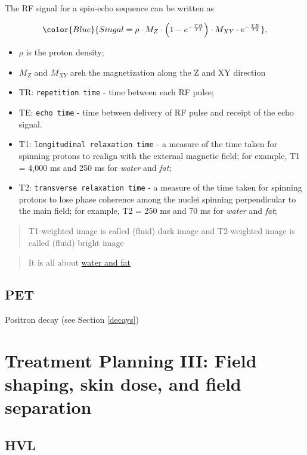 \documentclass[]{book}
\providecommand{\tightlist}{%
  \setlength{\itemsep}{0pt}\setlength{\parskip}{0pt}}
\theoremstyle{definition}
\theoremstyle{definition}
\theoremstyle{definition}
\theoremstyle{remark}
\begin{document}
The RF signal for a spin-echo sequence can be written as

\[
\color{Blue} {Singal=\rho \cdot M_Z \cdot \left( 1-e^{-\frac{TR}{T1}} \right) \cdot M_{XY} \cdot e^{-\frac{TE}{T2}}},
\]

\begin{itemize}
\tightlist
\item
  \(\rho\) is the proton density;
\item
  \(M_Z\) and \(M_{XY}\) areh the magnetization along the Z and XY
  direction
\item
  TR: \texttt{repetition\ time} - time between each RF pulse;
\item
  TE: \texttt{echo\ time} - time between delivery of RF pulse and
  receipt of the echo signal.
\item
  T1: \texttt{longitudinal\ relaxation\ time} - a measure of the time
  taken for spinning protons to realign with the external magnetic
  field; for example, T1 = 4,000 ms and 250 ms for \emph{water} and
  \emph{fat};
\item
  T2: \texttt{transverse\ relaxation\ time} - a measure of the time
  taken for spinning protons to lose phase coherence among the nuclei
  spinning perpendicular to the main field; for example, T2 = 250 ms and
  70 ms for \emph{water} and \emph{fat};
\end{itemize}

\begin{quote}
T1-weighted image is called (fluid) dark image and T2-weighted image is
called (fluid) bright image
\end{quote}

\begin{quote}
It is all about
\href{https://www.radiologymasterclass.co.uk/tutorials/mri/t1_and_t2_images}{water
and fat}
\end{quote}

\section{PET}\label{pet}

Positron decay (see Section \ref{decays})

\chapter{Treatment Planning III: Field shaping, skin dose, and field
separation}\label{planning3}

\section{HVL}\label{hvl}
\end{document}
